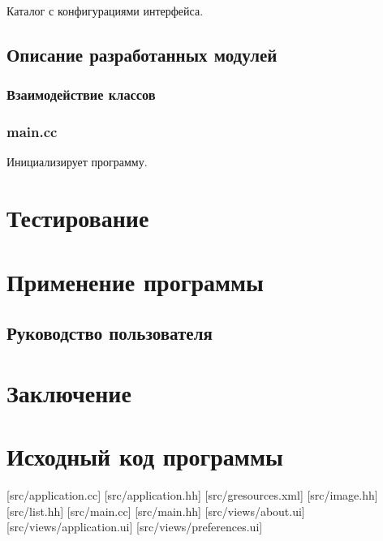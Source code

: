 \documentclass[variant=courcework]{bsuir}
\begin{document}
Каталог с конфигурациями интерфейса.

\section{Описание разработанных модулей}

\subsection{Взаимодействие классов}


\subsection{main.cc}

Инициализирует программу.

\chapter{Тестирование}

\chapter{Применение программы}

\section{Руководство пользователя}

\chapter*{Заключение}



\appendix

\chapter[обязательное]{Исходный код программы}

[src/application.cc]
[src/application.hh]
[src/gresources.xml]
[src/image.hh]
[src/list.hh]
[src/main.cc]
[src/main.hh]
[src/views/about.ui]
[src/views/application.ui]
[src/views/preferences.ui]
\end{document}
